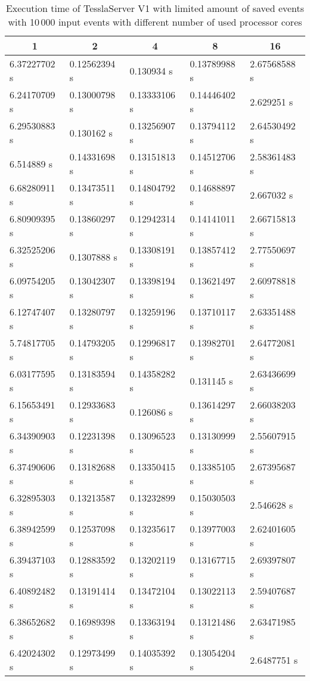 \begin{table}[!htb]
  \centering
  \caption{Execution time of TesslaServer V1 with limited amount of saved events with 10\,000 input events with different number of used processor cores}
  \label{table:tessla_server_v1_5_num_cores_data}
  \begin{tabular}{lllll}
    \multicolumn{1}{c}{1} & \multicolumn{1}{c}{2} & \multicolumn{1}{c}{4} & \multicolumn{1}{c}{8} & \multicolumn{1}{c}{16} \\ \hline
    6.37227702 s & 0.12562394 s & 0.130934 s   & 0.13789988 s & 2.67568588 s \\
    6.24170709 s & 0.13000798 s & 0.13333106 s & 0.14446402 s & 2.629251 s   \\
    6.29530883 s & 0.130162 s   & 0.13256907 s & 0.13794112 s & 2.64530492 s \\
    6.514889 s   & 0.14331698 s & 0.13151813 s & 0.14512706 s & 2.58361483 s \\
    6.68280911 s & 0.13473511 s & 0.14804792 s & 0.14688897 s & 2.667032 s   \\
    6.80909395 s & 0.13860297 s & 0.12942314 s & 0.14141011 s & 2.66715813 s \\
    6.32525206 s & 0.1307888 s  & 0.13308191 s & 0.13857412 s & 2.77550697 s \\
    6.09754205 s & 0.13042307 s & 0.13398194 s & 0.13621497 s & 2.60978818 s \\
    6.12747407 s & 0.13280797 s & 0.13259196 s & 0.13710117 s & 2.63351488 s \\
    5.74817705 s & 0.14793205 s & 0.12996817 s & 0.13982701 s & 2.64772081 s \\
    6.03177595 s & 0.13183594 s & 0.14358282 s & 0.131145 s   & 2.63436699 s \\
    6.15653491 s & 0.12933683 s & 0.126086 s   & 0.13614297 s & 2.66038203 s \\
    6.34390903 s & 0.12231398 s & 0.13096523 s & 0.13130999 s & 2.55607915 s \\
    6.37490606 s & 0.13182688 s & 0.13350415 s & 0.13385105 s & 2.67395687 s \\
    6.32895303 s & 0.13213587 s & 0.13232899 s & 0.15030503 s & 2.546628 s   \\
    6.38942599 s & 0.12537098 s & 0.13235617 s & 0.13977003 s & 2.62401605 s \\
    6.39437103 s & 0.12883592 s & 0.13202119 s & 0.13167715 s & 2.69397807 s \\
    6.40892482 s & 0.13191414 s & 0.13472104 s & 0.13022113 s & 2.59407687 s \\
    6.38652682 s & 0.16989398 s & 0.13363194 s & 0.13121486 s & 2.63471985 s \\
    6.42024302 s & 0.12973499 s & 0.14035392 s & 0.13054204 s & 2.6487751 s
  \end{tabular}
\end{table}

